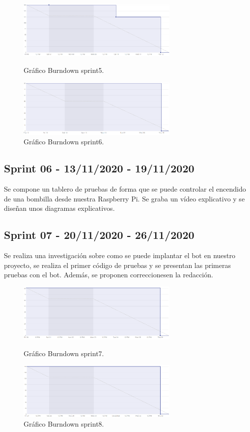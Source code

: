 \begin{figure}
    \centering
    \includegraphics[width=0.7\textwidth]{img/BurnDown/5.PNG}
    \caption{Gráfico Burndown sprint5. } \label{BD5}
    \includegraphics[width=0.7\textwidth]{img/BurnDown/6.PNG}
    \caption{Gráfico Burndown sprint6. } \label{BD6}
\end{figure}

\subsection{Sprint 06 - 13/11/2020 - 19/11/2020}
Se compone un tablero de pruebas de forma que se puede controlar el encendido de una bombilla desde nuestra Raspberry Pi. Se graba un vídeo explicativo y se diseñan unos diagramas explicativos.


\subsection{Sprint 07 - 20/11/2020 - 26/11/2020}
Se realiza una investigación sobre como se puede implantar el bot en nuestro proyecto, se realiza el primer código de pruebas y se presentan las primeras pruebas con el bot. Además, se proponen correccionesen la redacción.

\begin{figure}
    \centering
    \includegraphics[width=0.7\textwidth]{img/BurnDown/7.PNG}
    \caption{Gráfico Burndown sprint7. } \label{BD7}
    \includegraphics[width=0.7\textwidth]{img/BurnDown/8.PNG}
    \caption{Gráfico Burndown sprint8. } \label{BD8}
\end{figure}

